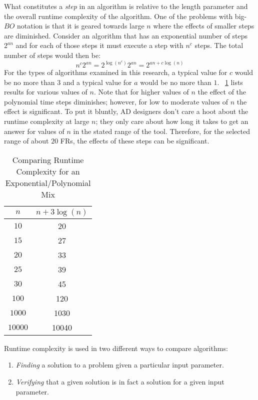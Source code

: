 What constitutes a \emph{step} in an algorithm is relative to the length parameter and the overall runtime
complexity of the algorithm.  One of the problems with big-\(BO\) notation is that it is geared towards large \(n\)
where the effects of smaller steps are diminished.  Consider an algorithm that has an exponential number of steps
\(2^{an}\) and for each of those steps it must execute a step with \(n^c\) steps.  The total number of steps would
then be:
\[n^c2^{an}=2^{\log(n^c)}2^{an}=2^{an+c\log(n)}\]
For the types of algorithms examined in this research, a typical value for \(c\) would be no more than \(3\) and a
typical value for \(a\) would be no more than \(1\).  \tablename~\ref{tab:grow} lists results for various values of
\(n\).  Note that for higher values of \(n\) the effect of the polynomial time steps diminishes; however, for low
to moderate values of \(n\) the effect is significant.  To put it bluntly, AD designers don't care a hoot about the
runtime complexity at large \(n\); they only care about how long it takes to get an answer for values of \(n\) in
the stated range of the tool.  Therefore, for the selected range of about \(20\) FRs, the effects of these steps
can be significant.

\begin{table}[H]
  \setlength{\extrarowheight}{2ex}
  \centering
  \caption{Comparing Runtime Complexity for an Exponential/Polynomial Mix}
  \label{tab:grow}
  \begin{tabular}{|c|c|}
    \hline
    \(n\) & \(n+3\log(n)\) \\
    \hline
    \(10\) & 20 \\
    \hline
    \(15\) & 27 \\
    \hline
    \(20\) & 33 \\
    \hline
    \(25\) & 39 \\
    \hline
    \(30\) & 45 \\
    \hline
    \(100\) & 120 \\
    \hline
    \(1000\) & 1030 \\
    \hline
    \(10000\) & 10040 \\
    \hline
  \end{tabular}
\end{table}

Runtime complexity is used in two different ways to compare algorithms:
\begin{enumerate}
\item \emph{Finding} a solution to a problem given a particular input parameter.
\item \emph{Verifying} that a given solution is in fact a solution for a given input parameter.
\end{enumerate}

